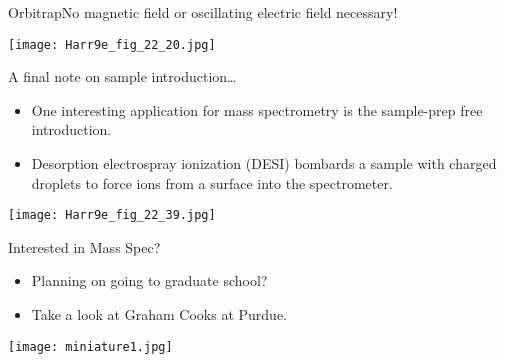 \documentclass[handout]{beamer}
\begin{document}
\begin{frame}{Orbitrap}{No magnetic field or oscillating electric field
	necessary!}
	\begin{center}
		\texttt{[image: Harr9e\_fig\_22\_20.jpg]}
	\end{center}
\end{frame}

\begin{frame}{A final note on sample introduction\ldots}
	\begin{itemize}
		\item One interesting application for mass spectrometry is the
			sample-prep free introduction.
		\item \alert{Desorption electrospray ionization (DESI)} bombards
			a sample with charged droplets to force ions from a
			surface into the spectrometer.
	\end{itemize}

	\begin{center}
		\texttt{[image: Harr9e\_fig\_22\_39.jpg]}
	\end{center}
\end{frame}

\begin{frame}{Interested in Mass Spec?}
	\begin{itemize}
		\item Planning on going to graduate school?
		\item Take a look at \alert{Graham Cooks} at \alert{Purdue}.
	\end{itemize}

	\begin{center}
		\texttt{[image: miniature1.jpg]}
	\end{center}

\end{frame}

	
\end{document}
